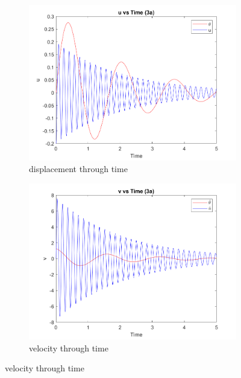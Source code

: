 \documentclass[a4paper,12pt]{article}
\begin{document}
\begin{figure}[h]
  \centering
  \begin{subfigure}[b]{0.5\textwidth}
      \includegraphics[width=\textwidth]{../../Matlab/task3a_plots/u_vs_time.png}
      \caption{displacement through time}
      \label{fig:image1}
  \end{subfigure}
  \hspace{-1.0em}%
  \begin{subfigure}[b]{0.5\textwidth}
      \includegraphics[width=\textwidth]{../../Matlab/task3a_plots/v_vs_time.png}
      \caption{velocity through time}
      \label{fig:image2}
  \end{subfigure}


\end{figure}
\end{document}
